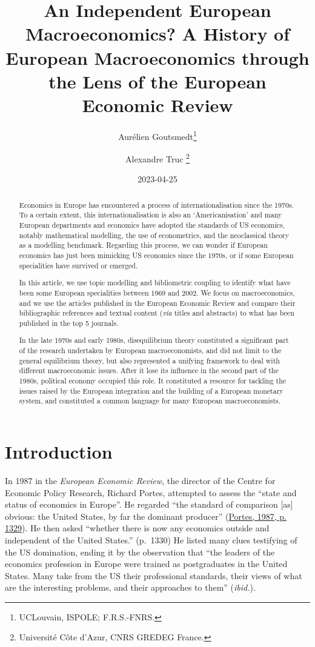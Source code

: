 \documentclass[
  12pt,
  onecolumn]{article}
\title{An Independent European Macroeconomics? A History of European
Macroeconomics through the Lens of the European Economic Review}
\author{Aurélien Goutsmedt\footnote{UCLouvain, ISPOLE; F.R.S.-FNRS.} \and Alexandre
Truc \footnote{Université Côte d'Azur, CNRS GREDEG France.}}
\date{2023-04-25}
\begin{document}
\maketitle
\begin{abstract}
Economics in Europe has encountered a process of internationalisation
since the 1970s. To a certain extent, this internationalisation is also
an `Americanisation' and many European departments and economics have
adopted the standards of US economics, notably mathematical modelling,
the use of econometrics, and the neoclassical theory as a modelling
benchmark. Regarding this process, we can wonder if European economics
has just been mimicking US economics since the 1970s, or if some
European specialities have survived or emerged.

In this article, we use topic modelling and bibliometric coupling to
identify what have been some European specialities between 1969 and
2002. We focus on macroeconomics, and we use the articles published in
the European Economic Review and compare their bibliographic references
and textual content (\emph{via} titles and abstracts) to what has been
published in the top 5 journals.

In the late 1970s and early 1980s, disequilibrium theory constituted a
significant part of the research undertaken by European macroeconomists,
and did not limit to the general equilibrium theory, but also
represented a unifying framework to deal with different macroeconomic
issues. After it lose its influence in the second part of the 1980s,
political economy occupied this role. It constituted a resource for
tackling the issues raised by the European integration and the building
of a European monetary system, and constituted a common language for
many European macroeconomists.
\end{abstract}

\hypertarget{introduction}{%
\section{Introduction}\label{introduction}}

In 1987 in the \emph{European Economic Review}, the director of the
Centre for Economic Policy Research, Richard Portes, attempted to assess
the ``state and status of economics in Europe''. He regarded ``the
standard of comparison {[}as{]} obvious: the United States, by far the
dominant producer'' (\protect\hyperlink{ref-portes1987}{Portes, 1987, p.
1329}). He then asked ``whether there is now any economics outside and
independent of the United States.'' (p.~1330) He listed many clues
testifying of the US domination, ending it by the observation that ``the
leaders of the economics profession in Europe were trained as
postgraduates in the United States. Many take from the US their
professional standards, their views of what are the interesting
problems, and their approaches to them'' (\emph{ibid.}).
\end{document}
